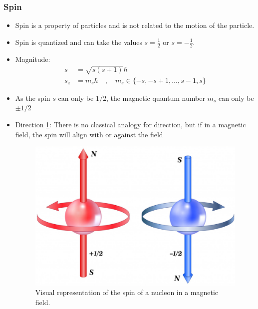 \documentclass{article}
\begin{document}
\subsubsection{Spin}
\begin{itemize}
    \item Spin is a property of particles and is not related to the motion of the particle. 
    \item Spin is quantized and can take the values $s = \frac{1}{2}$ or $s = -\frac{1}{2}$.
    \item Magnitude: 
    \begin{align}
    s &= \sqrt{s(s+1)}ℏ \\
    s_z &= m_sℏ \quad , \quad m_s ∈ \{-s, -s+1, \ldots, s-1, s\} 
    \end{align} 
    \item As the spin $s$ can only be $1 / 2$, the magnetic quantum number $m_s$ can only be $\pm 1 / 2$
    \item Direction \cref{fig: spin_direction}: There is no classical analogy for direction, but if in a magnetic field, the spin will align with or against the field 
    \begin{figure}[h!]
    \centering
    \includegraphics[width = .75\textwidth]{spin_direction.png}
    \caption{Visual representation of the spin of a nucleon in a magnetic field.}
    \label{fig: spin_direction}
    \end{figure}
\end{itemize}
\newpage
\end{document}
